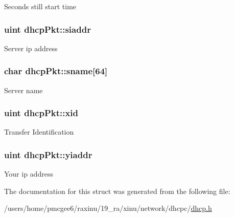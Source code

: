 Seconds still start time \hypertarget{structdhcpPkt_a9491030b52f03e8a652e81122619d62c}{
\subsubsection[{siaddr}]{\setlength{\rightskip}{0pt plus 5cm}uint dhcp\-Pkt\-::siaddr}}\label{structdhcpPkt_a9491030b52f03e8a652e81122619d62c}
Server ip address \hypertarget{structdhcpPkt_a9d689ffd1a62795bc7e2c9f8d307711c}{
\subsubsection[{sname}]{\setlength{\rightskip}{0pt plus 5cm}char dhcp\-Pkt\-::sname\mbox{[}64\mbox{]}}}\label{structdhcpPkt_a9d689ffd1a62795bc7e2c9f8d307711c}
Server name \hypertarget{structdhcpPkt_a07f00255478787b96a0cab3fcd8bedc0}{
\subsubsection[{xid}]{\setlength{\rightskip}{0pt plus 5cm}uint dhcp\-Pkt\-::xid}}\label{structdhcpPkt_a07f00255478787b96a0cab3fcd8bedc0}
Transfer Identification \hypertarget{structdhcpPkt_a8c4bd15e865dad84840058a7fb94c12d}{
\subsubsection[{yiaddr}]{\setlength{\rightskip}{0pt plus 5cm}uint dhcp\-Pkt\-::yiaddr}}\label{structdhcpPkt_a8c4bd15e865dad84840058a7fb94c12d}
Your ip address 

The documentation for this struct was generated from the following file\-:\begin{DoxyCompactItemize}
\item 
/users/home/pmcgee6/raxinu/19\-\_\-ra/xinu/network/dhcpc/\hyperlink{dhcp_8h}{dhcp.\-h}\end{DoxyCompactItemize}
